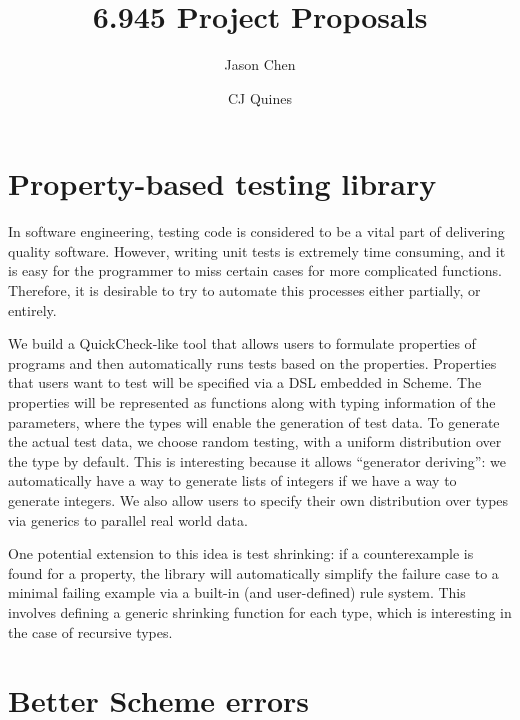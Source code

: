 \documentclass{scrartcl}
\title{6.945 Project Proposals}
\author{Jason Chen \and CJ Quines}
\begin{document}
\maketitle

\section{Property-based testing library}

In software engineering, testing code is considered to
be a vital part of delivering quality software.
However, writing unit tests is extremely time consuming,
and it is easy for the programmer to miss certain cases
for more complicated functions.
Therefore, it is desirable to try to automate this processes
either partially, or entirely.

We build a QuickCheck-like tool that allows users to
formulate properties of programs and then
automatically runs tests based on the properties.
Properties that users want to test will be specified
via a DSL embedded in Scheme.
The properties will be represented as functions
along with typing information of the parameters,
where the types will enable the generation of test data.
To generate the actual test data, we choose random testing,
with a uniform distribution over the type by default.
This is interesting because it allows ``generator deriving'':
we automatically have a way to generate lists of integers
if we have a way to generate integers.
We also allow users to specify their own distribution
over types via generics to parallel real world data. %

One potential extension to this idea is test shrinking:
if a counterexample is found for a property,
the library will automatically simplify
the failure case to a minimal failing example
via a built-in (and user-defined) rule system.
This involves defining a generic shrinking function for each type,
which is interesting in the case of recursive types.



\section{Better Scheme errors}
\end{document}
